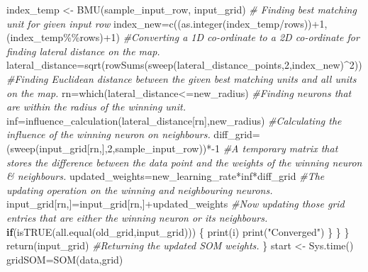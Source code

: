 \documentclass[
]{article}
\newenvironment{Shaded}{\begin{snugshade}}{\end{snugshade}}
\newcommand{\CommentTok}[1]{\textcolor[rgb]{0.56,0.35,0.01}{\textit{#1}}}
\newcommand{\ControlFlowTok}[1]{\textcolor[rgb]{0.13,0.29,0.53}{\textbf{#1}}}
\newcommand{\DecValTok}[1]{\textcolor[rgb]{0.00,0.00,0.81}{#1}}
\newcommand{\FunctionTok}[1]{\textcolor[rgb]{0.00,0.00,0.00}{#1}}
\newcommand{\NormalTok}[1]{#1}
\newcommand{\OtherTok}[1]{\textcolor[rgb]{0.56,0.35,0.01}{#1}}
\newcommand{\SpecialCharTok}[1]{\textcolor[rgb]{0.00,0.00,0.00}{#1}}
\newcommand{\StringTok}[1]{\textcolor[rgb]{0.31,0.60,0.02}{#1}}
\begin{document}
\begin{Shaded}
\begin{Highlighting}[]
\NormalTok{      index\_temp }\OtherTok{\textless{}{-}} \FunctionTok{BMU}\NormalTok{(sample\_input\_row, input\_grid) }\CommentTok{\# Finding best matching unit for given input row}
\NormalTok{      index\_new}\OtherTok{=}\FunctionTok{c}\NormalTok{((}\FunctionTok{as.integer}\NormalTok{(index\_temp}\SpecialCharTok{/}\NormalTok{rows))}\SpecialCharTok{+}\DecValTok{1}\NormalTok{,(index\_temp}\SpecialCharTok{\%\%}\NormalTok{rows)}\SpecialCharTok{+}\DecValTok{1}\NormalTok{) }\CommentTok{\#Converting a 1D co{-}ordinate to a 2D co{-}ordinate for finding lateral distance on the map.}
\NormalTok{      lateral\_distance}\OtherTok{=}\FunctionTok{sqrt}\NormalTok{(}\FunctionTok{rowSums}\NormalTok{(}\FunctionTok{sweep}\NormalTok{(lateral\_distance\_points,}\DecValTok{2}\NormalTok{,index\_new)}\SpecialCharTok{\^{}}\DecValTok{2}\NormalTok{)) }\CommentTok{\#Finding Euclidean distance between the given best matching units and all units on the map.}
\NormalTok{      rn}\OtherTok{=}\FunctionTok{which}\NormalTok{(lateral\_distance}\SpecialCharTok{\textless{}=}\NormalTok{new\_radius) }\CommentTok{\#Finding neurons that are within the radius of the winning unit.}
\NormalTok{      inf}\OtherTok{=}\FunctionTok{influence\_calculation}\NormalTok{(lateral\_distance[rn],new\_radius) }\CommentTok{\#Calculating the influence of the winning neuron on neighbours.}
\NormalTok{      diff\_grid}\OtherTok{=}\NormalTok{(}\FunctionTok{sweep}\NormalTok{(input\_grid[rn,],}\DecValTok{2}\NormalTok{,sample\_input\_row))}\SpecialCharTok{*{-}}\DecValTok{1} \CommentTok{\#A temporary matrix that stores the difference between the data point and the weights of the winning neuron \& neighbours.}
\NormalTok{      updated\_weights}\OtherTok{=}\NormalTok{new\_learning\_rate}\SpecialCharTok{*}\NormalTok{inf}\SpecialCharTok{*}\NormalTok{diff\_grid }\CommentTok{\#The updating operation on the winning and neighbouring neurons.}
\NormalTok{      input\_grid[rn,]}\OtherTok{=}\NormalTok{input\_grid[rn,]}\SpecialCharTok{+}\NormalTok{updated\_weights }\CommentTok{\#Now updating those grid entries that are either the winning neuron or its neighbours.}
      \ControlFlowTok{if}\NormalTok{(}\FunctionTok{isTRUE}\NormalTok{(}\FunctionTok{all.equal}\NormalTok{(old\_grid,input\_grid)))}
\NormalTok{      \{}
        \FunctionTok{print}\NormalTok{(i)}
        \FunctionTok{print}\NormalTok{(}\StringTok{"Converged"}\NormalTok{)}
\NormalTok{      \}}
\NormalTok{    \}}
\NormalTok{  \}}
  \FunctionTok{return}\NormalTok{(input\_grid) }\CommentTok{\#Returning the updated SOM weights.}
\NormalTok{\}}
\NormalTok{start }\OtherTok{\textless{}{-}} \FunctionTok{Sys.time}\NormalTok{()}
\NormalTok{gridSOM}\OtherTok{=}\FunctionTok{SOM}\NormalTok{(data,grid)}
\end{Highlighting}
\end{Shaded}
\end{document}
